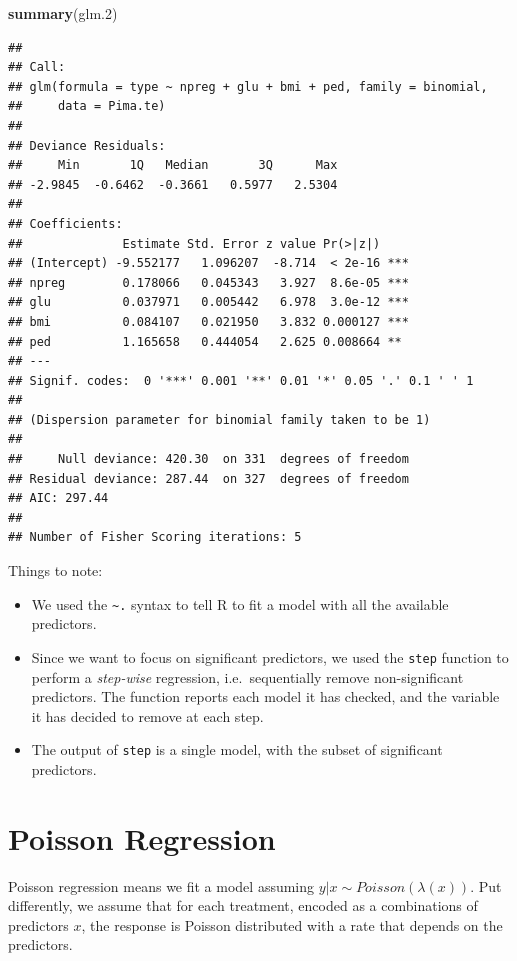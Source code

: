 \documentclass[]{book}
\newenvironment{Shaded}{\begin{snugshade}}{\end{snugshade}}
\newcommand{\KeywordTok}[1]{\textcolor[rgb]{0.13,0.29,0.53}{\textbf{{#1}}}}
\newcommand{\FloatTok}[1]{\textcolor[rgb]{0.00,0.00,0.81}{{#1}}}
\newcommand{\NormalTok}[1]{{#1}}
\providecommand{\tightlist}{%
  \setlength{\itemsep}{0pt}\setlength{\parskip}{0pt}}
\theoremstyle{definition}
\theoremstyle{definition}
\theoremstyle{remark}
\begin{document}
\begin{Shaded}
\begin{Highlighting}[]
\KeywordTok{summary}\NormalTok{(glm}\FloatTok{.2}\NormalTok{)}
\end{Highlighting}
\end{Shaded}

\begin{verbatim}
## 
## Call:
## glm(formula = type ~ npreg + glu + bmi + ped, family = binomial, 
##     data = Pima.te)
## 
## Deviance Residuals: 
##     Min       1Q   Median       3Q      Max  
## -2.9845  -0.6462  -0.3661   0.5977   2.5304  
## 
## Coefficients:
##              Estimate Std. Error z value Pr(>|z|)    
## (Intercept) -9.552177   1.096207  -8.714  < 2e-16 ***
## npreg        0.178066   0.045343   3.927  8.6e-05 ***
## glu          0.037971   0.005442   6.978  3.0e-12 ***
## bmi          0.084107   0.021950   3.832 0.000127 ***
## ped          1.165658   0.444054   2.625 0.008664 ** 
## ---
## Signif. codes:  0 '***' 0.001 '**' 0.01 '*' 0.05 '.' 0.1 ' ' 1
## 
## (Dispersion parameter for binomial family taken to be 1)
## 
##     Null deviance: 420.30  on 331  degrees of freedom
## Residual deviance: 287.44  on 327  degrees of freedom
## AIC: 297.44
## 
## Number of Fisher Scoring iterations: 5
\end{verbatim}

Things to note:

\begin{itemize}
\tightlist
\item
  We used the \texttt{\textasciitilde{}.} syntax to tell R to fit a
  model with all the available predictors.
\item
  Since we want to focus on significant predictors, we used the
  \texttt{step} function to perform a \emph{step-wise} regression,
  i.e.~sequentially remove non-significant predictors. The function
  reports each model it has checked, and the variable it has decided to
  remove at each step.
\item
  The output of \texttt{step} is a single model, with the subset of
  significant predictors.
\end{itemize}

\section{Poisson Regression}\label{poisson-regression}

Poisson regression means we fit a model assuming
\(y|x \sim Poisson(\lambda(x))\). Put differently, we assume that for
each treatment, encoded as a combinations of predictors \(x\), the
response is Poisson distributed with a rate that depends on the
predictors.
\end{document}
